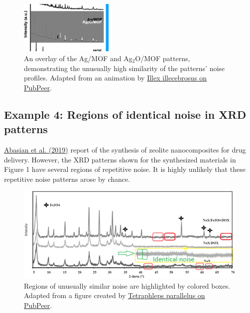 \documentclass[letterpaper, 12pt]{article}
\begin{document}
\begin{figure}[h!tbp]
    \centering
    \includegraphics[width=0.4\textwidth]{img/xrd_data_duplication/mohaghegh_figure_2_animation.png}
    \caption*{An overlay of the Ag/MOF and Ag$_\text{2}$O/MOF patterns, demonstrating the unusually high similarity of the patterns' noise profiles. Adapted from an animation by \href{https://pubpeer.com/publications/7BE7C2A93C385F700F1C6B5BC90294\#8}{Illex illecebrosus on PubPeer}.}
\end{figure}

\pagebreak

\subsection*{Example 4: Regions of identical noise in XRD patterns}

\href{https://doi.org/10.1016/j.ijbiomac.2018.09.215}{Abasian et al. (2019)} report of the synthesis of zeolite nanocomposites for drug delivery. However, the XRD patterns shown for the synthesized materials in Figure 1 have several regions of repetitive noise. It is highly unlikely that these repetitive noise patterns arose by chance.

\begin{figure}[h!tbp]
    \centering
    \includegraphics[width=\textwidth]{img/xrd_data_duplication/abasian_figure_1.png}
    \caption*{Regions of unusually similar noise are highlighted by colored boxes. Adapted from a figure created by \href{https://pubpeer.com/publications/DB4037BDC430AFA6C281842E945363\#1}{Tetraphleps parallelus on PubPeer}.}
\end{figure}
\end{document}
